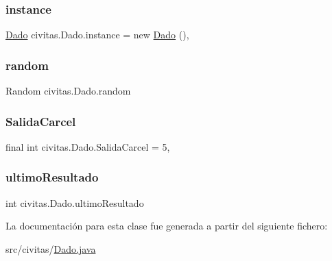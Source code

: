 \subsubsection{\texorpdfstring{instance}{instance}}
{\footnotesize\ttfamily \hyperlink{classcivitas_1_1Dado}{Dado} civitas.\+Dado.\+instance = new \hyperlink{classcivitas_1_1Dado}{Dado} ()\hspace{0.3cm}{\ttfamily [static]}, {\ttfamily [private]}}

\mbox{\label{classcivitas_1_1Dado_a1f8317d37f9ce44ed673e933b3967811}} 
\subsubsection{\texorpdfstring{random}{random}}
{\footnotesize\ttfamily Random civitas.\+Dado.\+random\hspace{0.3cm}{\ttfamily [private]}}

\mbox{\label{classcivitas_1_1Dado_a534213cedc8582a460c56c5ef47cc4b1}} 
\subsubsection{\texorpdfstring{Salida\+Carcel}{SalidaCarcel}}
{\footnotesize\ttfamily final int civitas.\+Dado.\+Salida\+Carcel = 5\hspace{0.3cm}{\ttfamily [static]}, {\ttfamily [private]}}

\mbox{\label{classcivitas_1_1Dado_abc53f914b4a8564f59a760e16f0a09ce}} 
\subsubsection{\texorpdfstring{ultimo\+Resultado}{ultimoResultado}}
{\footnotesize\ttfamily int civitas.\+Dado.\+ultimo\+Resultado\hspace{0.3cm}{\ttfamily [private]}}



La documentación para esta clase fue generada a partir del siguiente fichero\+:\begin{DoxyCompactItemize}
\item 
src/civitas/\hyperlink{Dado_8java}{Dado.\+java}\end{DoxyCompactItemize}
